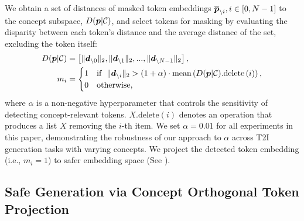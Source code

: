 We obtain a set of distances of masked token embeddings $\overline{\boldsymbol{p}}_{\backslash i}, i\in[0,N-1]$ to the concept subspace, $D(\boldsymbol{p}|\mathcal{C})$, and select tokens for masking by evaluating the disparity between each token's distance and the average distance of the set, excluding the token itself:
\begin{equation}
\begin{split}
D(\boldsymbol{p}|\mathcal{C})&=\left[\|\boldsymbol{d}_{\backslash 0}\|_2, \|\boldsymbol{d}_{\backslash 1}\|_2, ..., \|\boldsymbol{d}_{\backslash N-1}\|_2\right],\\
m_i&=\begin{cases} 1 & \text{if}~~\|\boldsymbol{d}_{\backslash i}\|_2 > \left(1+\alpha\right)\cdot\text{mean}\left(D(\boldsymbol{p}|\mathcal{C}).\text{{delete}}\left(i\right)\right),\\
                     0 &  \text{otherwise},
       \end{cases}
\end{split}
\end{equation}
where $\alpha$ is a non-negative hyperparameter that controls the sensitivity of detecting concept-relevant tokens. $X.\text{delete}(i)$ denotes an operation that produces a list $X$ removing the $i$-th item. We set $\alpha=0.01$ for all experiments in this paper, demonstrating the robustness of our approach to $\alpha$ across T2I generation tasks with varying concepts. We project the detected token embedding (i.e., $m_i=1$) to safer embedding space (See ).

\subsection{Safe Generation via Concept Orthogonal Token Projection}\label{sec:subsec:orthogonal_modification}

